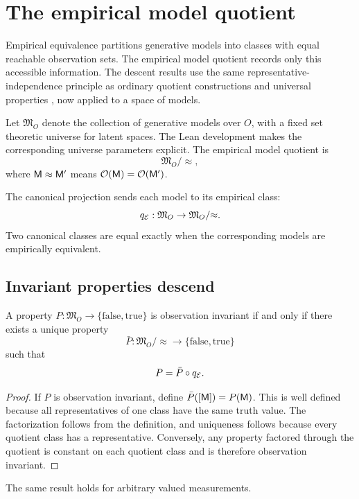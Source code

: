 \section{The empirical model quotient}
\label{sec:empiricalquotient}

Empirical equivalence partitions generative models into classes with equal reachable observation sets. The empirical model quotient records only this accessible information. The descent results use the same representative-independence principle as ordinary quotient constructions and universal properties \parencite{MacLaneBirkhoff1999,Leinster2014}, now applied to a space of models.

\begin{definition}
Let \(\mathfrak M_O\) denote the collection of generative models over \(O\), with a fixed set theoretic universe for latent spaces. The Lean development makes the corresponding universe parameters explicit. The empirical model quotient is
\[
\mathfrak M_O/{\approx},
\]
where \(\mathsf M\approx\mathsf M'\) means \(\mathcal O(\mathsf M)=\mathcal O(\mathsf M')\).
\end{definition}
The canonical projection sends each model to its empirical class:
\[
q_{\mathcal E}:\mathfrak M_O\to\mathfrak M_O/{\approx}.
\]
Two canonical classes are equal exactly when the corresponding models are empirically equivalent.

\subsection{Invariant properties descend}

\begin{theorem}
A property \(P:\mathfrak M_O\to\{\mathrm{false},\mathrm{true}\}\) is observation invariant if and only if there exists a unique property
\[
\bar P:\mathfrak M_O/{\approx}\to\{\mathrm{false},\mathrm{true}\}
\]
such that
\[
P=\bar P\circ q_{\mathcal E}.
\]
\end{theorem}

\begin{proof}
If \(P\) is observation invariant, define \(\bar P([\mathsf M])=P(\mathsf M)\). This is well defined because all representatives of one class have the same truth value. The factorization follows from the definition, and uniqueness follows because every quotient class has a representative. Conversely, any property factored through the quotient is constant on each quotient class and is therefore observation invariant.
\end{proof}
The same result holds for arbitrary valued measurements.

